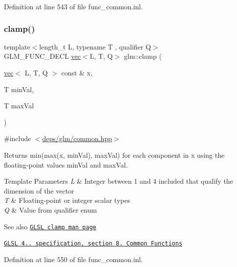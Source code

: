 Definition at line 543 of file func\+\_\+common.\+inl.

\mbox{\label{group__core__func__common_gabff13e6547edac08f52b4133ff4bf183}} 
\subsubsection{\texorpdfstring{clamp()}{clamp()}\hspace{0.1cm}{\footnotesize\ttfamily [2/3]}}
{\footnotesize\ttfamily template$<$length\+\_\+t L, typename T , qualifier Q$>$ \\
G\+L\+M\+\_\+\+F\+U\+N\+C\+\_\+\+D\+E\+CL \hyperlink{structglm_1_1vec}{vec}$<$L, T, Q$>$ glm\+::clamp (\begin{DoxyParamCaption}\item[{\hyperlink{structglm_1_1vec}{vec}$<$ L, T, Q $>$ const \&}]{x,  }\item[{T}]{min\+Val,  }\item[{T}]{max\+Val }\end{DoxyParamCaption})}



{\ttfamily \#include $<$\hyperlink{common_8hpp}{deps/glm/common.\+hpp}$>$}

Returns min(max(x, min\+Val), max\+Val) for each component in x using the floating-\/point values min\+Val and max\+Val.


\begin{DoxyTemplParams}{Template Parameters}
{\em L} & Integer between 1 and 4 included that qualify the dimension of the vector \\
\hline
{\em T} & Floating-\/point or integer scalar types \\
\hline
{\em Q} & Value from qualifier enum\\
\hline
\end{DoxyTemplParams}
\begin{DoxySeeAlso}{See also}
\href{http://www.opengl.org/sdk/docs/manglsl/xhtml/clamp.xml}{\tt G\+L\+SL clamp man page} 

\href{http://www.opengl.org/registry/doc/GLSLangSpec.4.20.8.pdf}{\tt G\+L\+SL 4.. specification, section 8. Common Functions} 
\end{DoxySeeAlso}


Definition at line 550 of file func\+\_\+common.\+inl.

